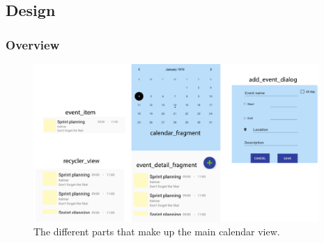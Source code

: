 \documentclass[]{article}
\begin{document}
\begin{flushleft}
\subsection{Design}

\subsubsection{Overview}

\begin{figure}[H]
	\includegraphics[width=\linewidth, height=60mm]{img/design.png}
	\caption{The different parts that make up the main calendar view.}
	\label{fig:design}
\end{figure}


\end{flushleft}
\end{document}
